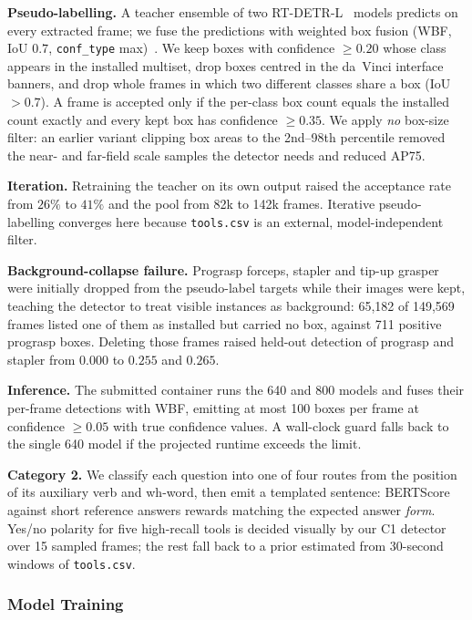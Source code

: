 \medskip
\noindent\textbf{Pseudo-labelling.} A teacher ensemble of two RT-DETR-L~\cite{APC_TDC_Zhao2024}
models predicts on every extracted frame; we fuse the predictions with weighted box fusion
(WBF, IoU $0.7$, \texttt{conf\_type} max)~\cite{APC_TDC_Solovyev2021}. We keep boxes with
confidence $\geq 0.20$ whose class appears in the installed multiset, drop boxes centred in
the da~Vinci interface banners, and drop whole frames in which two different classes share a
box (IoU $>0.7$). A frame is accepted only if the per-class box count equals the installed
count exactly and every kept box has confidence $\geq 0.35$. We apply \emph{no} box-size
filter: an earlier variant clipping box areas to the 2nd--98th percentile removed the near-
and far-field scale samples the detector needs and reduced AP75.

\medskip
\noindent\textbf{Iteration.} Retraining the teacher on its own output raised the
acceptance rate from $26\%$ to $41\%$ and the pool from 82k to 142k frames. Iterative
pseudo-labelling converges here because \texttt{tools.csv} is an external, model-independent
filter.

\medskip
\noindent\textbf{Background-collapse failure.} Prograsp forceps, stapler and tip-up grasper were
initially dropped from the pseudo-label targets while their images were kept, teaching the
detector to treat visible instances as background: 65,182 of 149,569 frames listed one of them
as installed but carried no box, against 711 positive prograsp boxes. Deleting those frames
raised held-out detection of prograsp and stapler from $0.000$ to $0.255$ and $0.265$.

\medskip
\noindent\textbf{Inference.} The submitted container runs the 640 and 800 models and fuses
their per-frame detections with WBF, emitting at most 100 boxes per frame at confidence
$\geq 0.05$ with true confidence values. A wall-clock guard falls back to the
single 640 model if the projected runtime exceeds the limit.

\medskip
\noindent\textbf{Category 2.} We classify each question into one of four routes from the position of
its auxiliary verb and wh-word, then emit a templated sentence: BERTScore against
short reference answers rewards matching the expected answer \emph{form}. Yes/no polarity for
five high-recall tools is decided visually by our C1 detector over 15 sampled frames; the rest
fall back to a prior estimated from 30-second windows of
\texttt{tools.csv}.

\subsubsection{Model Training}

